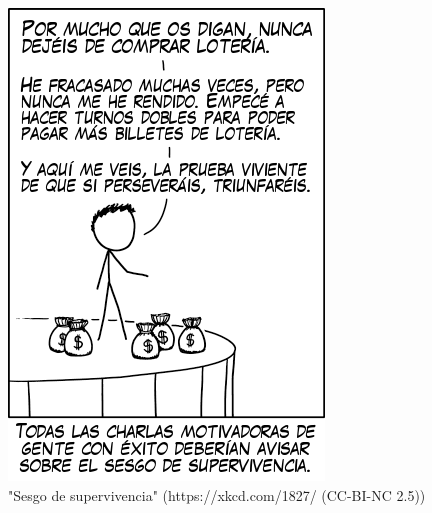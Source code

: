 \documentclass[
]{book}
\theoremstyle{definition}
\theoremstyle{definition}
\theoremstyle{definition}
\theoremstyle{definition}
\theoremstyle{remark}
\begin{document}
\begin{figure}

{\centering \includegraphics[width=0.5\linewidth]{downloadFigs4latex_INREMDN/sesgosup} 

}

\caption{"Sesgo de supervivencia" (https://xkcd.com/1827/ (CC-BI-NC 2.5))}\label{fig:sesgosup}
\end{figure}
\end{document}

